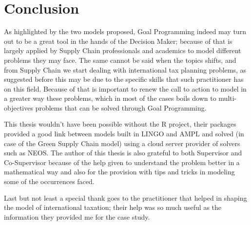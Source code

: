 \clearpage{\pagestyle{empty}\cleardoublepage}
\chapter*{Conclusion}

\begin{doublespace}
As highlighted by the two models proposed, Goal Programming indeed may turn out to be a great tool in the hands of the Decision Maker; because of that is largely applied by Supply Chain professionals and academics to model different problems they may face. The same cannot be said when the topics shifts, and from Supply Chain we start dealing with international tax planning problems, as suggested before this may be due to the specific skills that such practitioner has on this field. Because of that is important to renew the call to action to model in a greater way these problems, which in most of the cases boils down to multi-objectives problems that can be solved through Goal Programming.

This thesis wouldn't have been possible without the R project, their packages provided a good link between models built in LINGO and AMPL and solved (in case of the Green Supply Chain model) using a cloud server provider of solvers such as NEOS. The author of this thesis is also grateful to both Supervisor and Co-Supervisor because of the help given to understand the problem better in a mathematical way and also for the provision with tips and tricks in modeling some of the occurrences faced.

Last but not least a special thank goes to the practitioner that helped in shaping the model of international taxation; their help was so much useful as the information they provided me for the case study.    
\end{doublespace}

\clearpage{\pagestyle{empty}\cleardoublepage}
